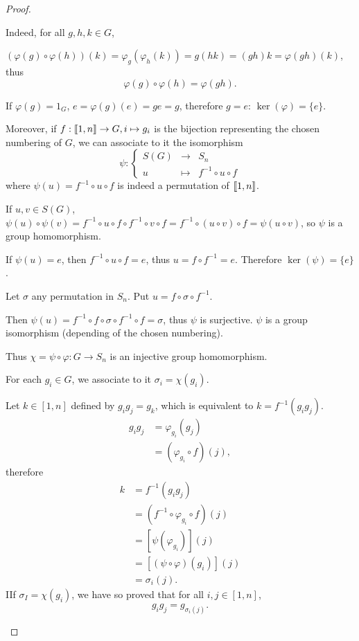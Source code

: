 \documentclass[11pt,a4paper]{article}
\def\gcro{\mbox{[\hspace{-.15em}[}}%
\def\dcro{\mbox{]\hspace{-.15em}]}}
\begin{document}
\begin{proof}
\begin{enumerate}
Indeed, for all $g,h,k \in G$, 

$(\varphi(g) \circ \varphi(h))(k) = \varphi_g(\varphi_h(k)) = g(hk) = (gh)k = \varphi(gh)(k)$, thus $$\varphi(g) \circ \varphi(h) =  \varphi(gh).$$

If $\varphi(g) = 1_G$, $e = \varphi(g)(e) = ge=g$, therefore $g=e$: $\ker(\varphi) = \{e\}$.

Moreover, if $f : \gcro 1,n \dcro \to G, i \mapsto g_i$ is the bijection representing the chosen numbering of $G$, we can associate to it the isomorphism
$$
\psi : 
\left\{
\begin{array}{ccc}
 S(G) &  \to  & S_n  \\
  u &  \mapsto  & f^{-1}\circ u \circ f   
\end{array}
\right.
$$
where $\psi(u) = f^{-1}\circ u \circ f$ is indeed a permutation of $\gcro 1,n \dcro$.

If $ u,v \in S(G)$, $\psi(u)\circ \psi(v) = f^{-1}\circ u \circ f \circ f^{-1} \circ v \circ f= f^{-1} \circ (u \circ v) \circ f = \psi(u\circ v)$, so $\psi$ is a group homomorphism.

If $\psi(u) = e$, then $f^{-1} \circ u \circ f = e$, thus $u = f \circ f^{-1} = e$. Therefore $\ker(\psi) = \{e\}$.

Let  $\sigma$ any permutation in $S_n$. Put  $u = f \circ \sigma \circ f^{-1}$. 

Then $\psi(u) = f^{-1} \circ f \circ \sigma \circ f^{-1} \circ f = \sigma$, thus $\psi$ is surjective. $\psi$ is a group isomorphism (depending of the chosen numbering).

Thus $\chi = \psi \circ \varphi : G \to S_n$ is an injective group homomorphism.

For each $g_i \in G$, we associate to it $\sigma_i = \chi(g_i)$.

Let $k \in [1,n]$ defined by $g_i g_j = g_k$, which is equivalent to $k = f^{-1}(g_i g_j)$.
\begin{align*}
g_i g_j &= \varphi_{g_i}(g_j)\\
&= (\varphi_{g_i} \circ f)(j),
\end{align*}
therefore 
\begin{align*}
k &= f^{-1}(g_i g_j)\\
&= (f^{-1} \circ \varphi_{g_i} \circ f)(j)\\
&=[\psi(\varphi_{g_i})](j)\\
&= [(\psi \circ \varphi)(g_i)](j)\\
&=\sigma_i(j).
\end{align*}
IIf $\sigma_I = \chi(g_i)$, we have so proved that for all $i,j \in [1,n]$,
$$g_i g_j = g_{\sigma_i(j)}.$$
\end{enumerate}

\end{proof}
\end{document}
